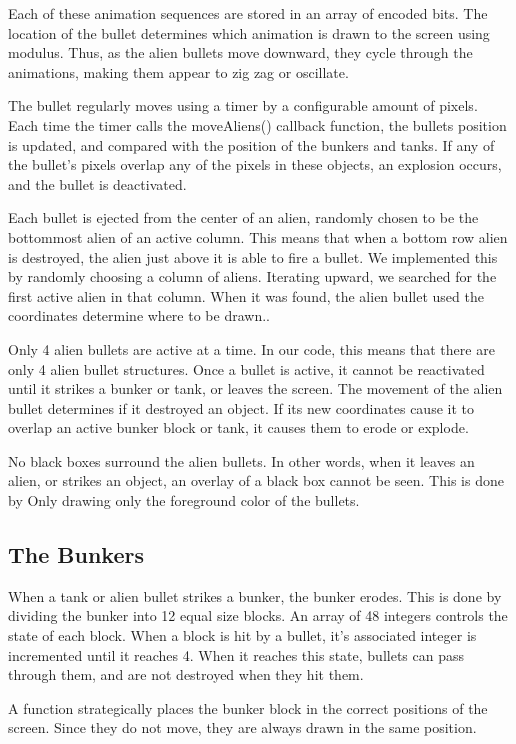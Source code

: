 \documentclass[11pt,letter,oneside]{report}
\begin{document}
Each of these animation sequences are stored in an array of encoded bits. The location of the bullet determines which animation is drawn to the screen using modulus. Thus, as the alien bullets move downward, they cycle through the animations, making them appear to zig zag or oscillate.


The bullet regularly moves using a timer by a configurable amount of pixels. Each time the timer calls the moveAliens() callback function, the bullets position is updated, and compared with the position of the bunkers and tanks. If any of the bullet's pixels overlap any of the pixels in these objects, an explosion occurs, and the bullet is deactivated.

Each bullet is ejected from the center of an alien, randomly chosen to be the bottommost alien of an active column. This means that when a bottom row alien is destroyed, the alien just above it is able to fire a bullet. We implemented this by randomly choosing a column of aliens. Iterating upward, we searched for the first active alien in that column. When it was found, the alien bullet used the coordinates determine where to be drawn..

Only 4 alien bullets are active at a time. In our code, this means that there are only 4 alien bullet structures. Once a bullet is active, it cannot be reactivated until it strikes a bunker or tank, or leaves the screen. The movement of the alien bullet determines if it destroyed an object. If its new coordinates cause it to overlap an active bunker block or tank, it causes them to erode or explode.

No black boxes surround the alien bullets. In other words, when it leaves an alien, or strikes an object, an overlay of a black box cannot be seen. This is done by Only drawing only the foreground color of the bullets.

\subsection{The Bunkers}

When a tank or alien bullet strikes a bunker, the bunker erodes. This is done by dividing the bunker into 12 equal size blocks. An array of 48 integers controls the state of each block. When a block is hit by a bullet, it's associated integer is incremented until it reaches 4. When it reaches this state, bullets can pass through them, and are not destroyed when they hit them.

A function strategically places the bunker block in the correct positions of the screen. Since they do not move, they are always drawn in the same position.
\end{document}
